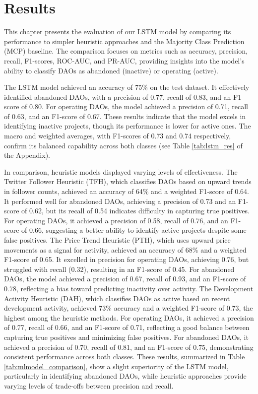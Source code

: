 \chapter{Results}
This chapter presents the evaluation of our LSTM model by comparing its performance to simpler heuristic approaches and the Majority Class Prediction (MCP) baseline. The comparison focuses on metrics such as accuracy, precision, recall, F1-scores, ROC-AUC, and PR-AUC, providing insights into the model's ability to classify DAOs as abandoned (inactive) or operating (active).

The LSTM model achieved an accuracy of 75\% on the test dataset. It effectively identified abandoned DAOs, with a precision of 0.77, recall of 0.83, and an F1-score of 0.80. For operating DAOs, the model achieved a precision of 0.71, recall of 0.63, and an F1-score of 0.67. These results indicate that the model excels in identifying inactive projects, though its performance is lower for active ones. The macro and weighted averages, with F1-scores of 0.73 and 0.74 respectively, confirm its balanced capability across both classes (see Table \ref{tab:lstm_res} of the Appendix).

In comparison, heuristic models displayed varying levels of effectiveness. The Twitter Follower Heuristic (TFH), which classifies DAOs based on upward trends in follower counts, achieved an accuracy of 64\% and a weighted F1-score of 0.64. It performed well for abandoned DAOs, achieving a precision of 0.73 and an F1-score of 0.62, but its recall of 0.54 indicates difficulty in capturing true positives. For operating DAOs, it achieved a precision of 0.58, recall of 0.76, and an F1-score of 0.66, suggesting a better ability to identify active projects despite some false positives.
The Price Trend Heuristic (PTH), which uses upward price movements as a signal for activity, achieved an accuracy of 68\% and a weighted F1-score of 0.65. It excelled in precision for operating DAOs, achieving 0.76, but struggled with recall (0.32), resulting in an F1-score of 0.45. For abandoned DAOs, the model achieved a precision of 0.67, recall of 0.93, and an F1-score of 0.78, reflecting a bias toward predicting inactivity over activity.
The Development Activity Heuristic (DAH), which classifies DAOs as active based on recent development activity, achieved 73\% accuracy and a weighted F1-score of 0.73, the highest among the heuristic methods. For operating DAOs, it achieved a precision of 0.77, recall of 0.66, and an F1-score of 0.71, reflecting a good balance between capturing true positives and minimizing false positives. For abandoned DAOs, it achieved a precision of 0.70, recall of 0.81, and an F1-score of 0.75, demonstrating consistent performance across both classes.
These results, summarized in Table \ref{tab:mlmodel_comparison}, show a slight superiority of the LSTM model, particularly in identifying abandoned DAOs, while heuristic approaches provide varying levels of trade-offs between precision and recall.

